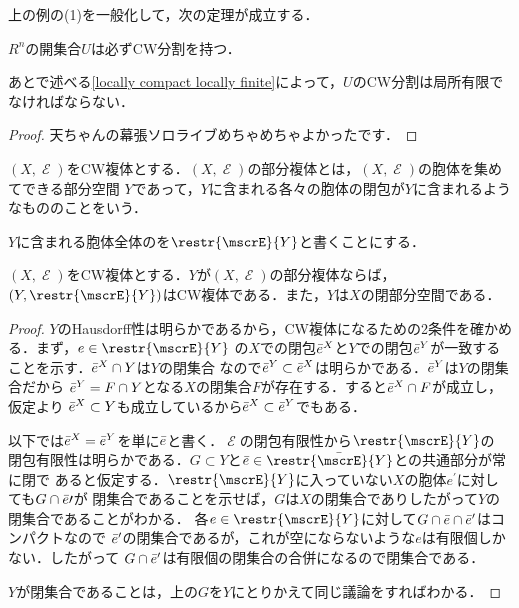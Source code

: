 \documentclass[uplatex]{jsarticle}
\begin{document}
上の例の(1)を一般化して，次の定理が成立する．

\begin{proposition}\label{Euclidean open set CW}
  $R^n$の開集合$U$は必ずCW分割を持つ．
\end{proposition}

あとで述べる\cref{locally compact locally finite}によって，$U$のCW分割は局所有限でなければならない．

\begin{proof}
  天ちゃんの幕張ソロライブめちゃめちゃよかったです．
\end{proof}

\begin{definition}
  $(X,\mscrE)$をCW複体とする．$(X,\mscrE)$の部分複体とは，$(X,\mscrE)$の胞体を集めてできる部分空間
  $Y$であって，$Y$に含まれる各々の胞体の閉包が$Y$に含まれるようなもののことをいう．
\end{definition}

$Y$に含まれる胞体全体のを$\restr{\mscrE}{Y}$と書くことにする．

\begin{theorem}
  $(X,\mscrE)$をCW複体とする．$Y$が$(X,\mscrE)$の部分複体ならば，$(Y,\restr{\mscrE}{Y})$はCW複体である．また，$Y$は$X$の閉部分空間である．
\end{theorem}

\begin{proof}
  $Y$のHausdorff性は明らかであるから，CW複体になるための2条件を確かめる．まず，$e\in \restr{\mscrE}{Y}$
  の$X$での閉包$\Bar{e}^X$と$Y$での閉包$\Bar{e}^Y$が一致することを示す．$\Bar{e}^X\cap Y$は$Y$の閉集合
  なので$\Bar{e}^Y\subset \Bar{e}^X$は明らかである．$\Bar{e}^Y$は$Y$の閉集合だから
  $\Bar{e}^Y = F\cap Y$となる$X$の閉集合$F$が存在する．すると$\Bar{e}^X \cap F$が成立し，仮定より
  $\Bar{e}^X\subset Y$も成立しているから$\Bar{e}^X\subset \Bar{e}^Y$でもある．

  以下では$\Bar{e}^X=\Bar{e}^Y$を単に$\Bar{e}$と書く．$\mscrE$の閉包有限性から$\restr{\mscrE}{Y}$の
  閉包有限性は明らかである．$G\subset Y$と$\Bar{e}\in {\restr{\Bar{\mscrE}}{Y}}$との共通部分が常に閉で
  あると仮定する．$\restr{\mscrE}{Y}$に入っていない$X$の胞体$e^\prime$に対しても$G\cap \Bar{e}\prime$が
  閉集合であることを示せば，$G$は$X$の閉集合でありしたがって$Y$の閉集合であることがわかる．
  各$e\in \restr{\mscrE}{Y}$に対して$G\cap \Bar{e} \cap \Bar{e}^\prime$はコンパクトなので
  $\Bar{e}^\prime$の閉集合であるが，これが空にならないような$e$は有限個しかない．したがって
  $G\cap \Bar{e}^\prime$は有限個の閉集合の合併になるので閉集合である．

  $Y$が閉集合であることは，上の$G$を$Y$にとりかえて同じ議論をすればわかる．
\end{proof}
\end{document}
